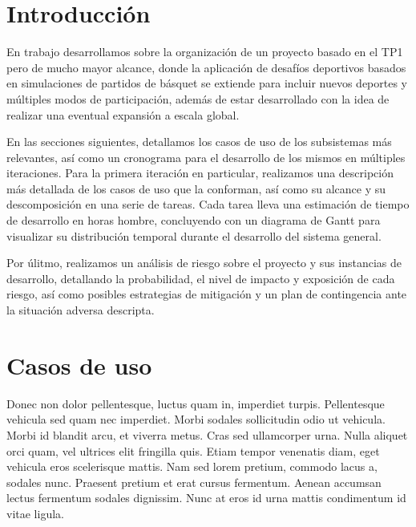 \documentclass[a4paper, 10pt, twoside]{article}
\begin{document}
\newpage

\tableofcontents

\newpage



\section{Introducción}

En trabajo desarrollamos sobre la organización de un proyecto basado en el TP1 pero de mucho mayor alcance, donde la aplicación de desafíos deportivos basados en simulaciones de partidos de básquet se extiende para incluir nuevos deportes y múltiples modos de participación, además de estar desarrollado con la idea de realizar una eventual expansión a escala global.

En las secciones siguientes, detallamos los casos de uso de los subsistemas más relevantes, así como un cronograma para el desarrollo de los mismos en múltiples iteraciones. Para la primera iteración en particular, realizamos una descripción más detallada de los casos de uso que la conforman, así como su alcance y su descomposición en una serie de tareas. Cada tarea lleva una estimación de tiempo de desarrollo en horas hombre, concluyendo con un diagrama de Gantt para visualizar su distribución temporal durante el desarrollo del sistema general.

Por úlitmo, realizamos un análisis de riesgo sobre el proyecto y sus instancias de desarrollo, detallando la probabilidad, el nivel de impacto y exposición de cada riesgo, así como posibles estrategias de mitigación y un plan de contingencia ante la situación adversa descripta.

\newpage


\section{Casos de uso}

Donec non dolor pellentesque, luctus quam in, imperdiet turpis. Pellentesque vehicula sed quam nec imperdiet. Morbi sodales sollicitudin odio ut vehicula. Morbi id blandit arcu, et viverra metus. Cras sed ullamcorper urna. Nulla aliquet orci quam, vel ultrices elit fringilla quis. Etiam tempor venenatis diam, eget vehicula eros scelerisque mattis. Nam sed lorem pretium, commodo lacus a, sodales nunc. Praesent pretium et erat cursus fermentum. Aenean accumsan lectus fermentum sodales dignissim. Nunc at eros id urna mattis condimentum id vitae ligula.
\end{document}
